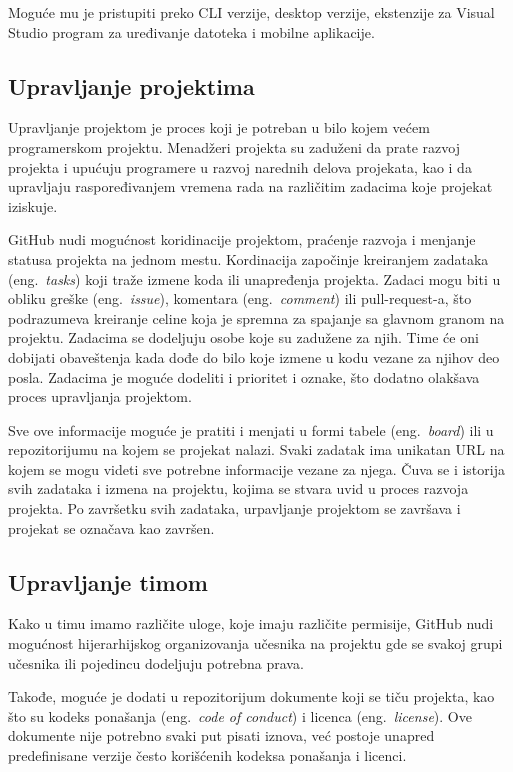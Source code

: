 \documentclass[12pt]{report}
\begin{document}
Moguće mu je pristupiti preko CLI verzije, desktop verzije, ekstenzije za Visual Studio program za uređivanje datoteka i mobilne aplikacije.

\subsection{Upravljanje projektima}
Upravljanje projektom je proces koji je potreban u bilo kojem većem programerskom projektu. Menadžeri projekta su zaduženi da prate razvoj projekta i upućuju programere u razvoj narednih delova projekata, kao i da upravljaju raspoređivanjem vremena rada na različitim zadacima koje projekat iziskuje.

GitHub nudi mogućnost koridinacije projektom, praćenje razvoja i menjanje statusa projekta na jednom mestu. Kordinacija započinje kreiranjem zadataka (eng.\ \textit{tasks}) koji traže izmene koda ili unapređenja projekta. Zadaci mogu biti u obliku greške (eng.\ \textit{issue}), komentara (eng.\ \textit{comment}) ili pull-request-a, što podrazumeva kreiranje celine koja je spremna za spajanje sa glavnom granom na projektu. Zadacima se dodeljuju osobe koje su zadužene za njih. Time će oni dobijati obaveštenja kada dođe do bilo koje izmene u kodu vezane za njihov deo posla. Zadacima je moguće dodeliti i prioritet i oznake, što dodatno olakšava proces upravljanja projektom.

Sve ove informacije moguće je pratiti i menjati u formi tabele (eng.\ \textit{board}) ili u repozitorijumu na kojem se projekat nalazi. Svaki zadatak ima unikatan URL na kojem se mogu videti sve potrebne informacije vezane za njega. Čuva se i istorija svih zadataka i izmena na projektu, kojima se stvara uvid u proces razvoja projekta. Po završetku svih zadataka, urpavljanje projektom se završava i projekat se označava kao završen.

\subsection{Upravljanje timom}
Kako u timu imamo različite uloge, koje imaju različite permisije, GitHub nudi mogućnost hijerarhijskog organizovanja učesnika na projektu gde se svakoj grupi učesnika ili pojedincu dodeljuju potrebna prava.

Takođe, moguće je dodati u repozitorijum dokumente koji se tiču projekta, kao što su kodeks ponašanja (eng.\ \textit{code of conduct}) i licenca (eng.\ \textit{license}). Ove dokumente nije potrebno svaki put pisati iznova, već postoje unapred predefinisane verzije često korišćenih kodeksa ponašanja i licenci.
\end{document}
